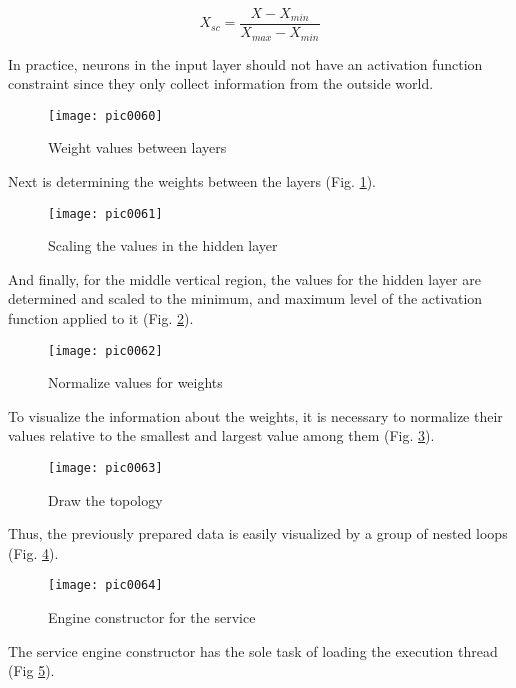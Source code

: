 \begin{equation}
\label{equation04}
X_{sc} = \frac{X-X_{min}}{X_{max}-X_{min}}
\end{equation}

In practice, neurons in the input layer should not have an activation function constraint since they only collect information from the outside world.

\begin{figure}[h]
\centering
\texttt{[image: pic0060]}
\caption{Weight values between layers}
\label{fig:pic0060}
\end{figure}
\FloatBarrier

Next is determining the weights between the layers (Fig. \ref{fig:pic0060}).

\begin{figure}[h]
\centering
\texttt{[image: pic0061]}
\caption{Scaling the values in the hidden layer}
\label{fig:pic0061}
\end{figure}
\FloatBarrier

And finally, for the middle vertical region, the values for the hidden layer are determined and scaled to the minimum, and maximum level of the activation function applied to it (Fig. \ref{fig:pic0061}).

\begin{figure}[h]
\centering
\texttt{[image: pic0062]}
\caption{Normalize values for weights}
\label{fig:pic0062}
\end{figure}
\FloatBarrier

To visualize the information about the weights, it is necessary to normalize their values relative to the smallest and largest value among them (Fig. \ref{fig:pic0062}).

\begin{figure}[h]
\centering
\texttt{[image: pic0063]}
\caption{Draw the topology}
\label{fig:pic0063}
\end{figure}
\FloatBarrier

Thus, the previously prepared data is easily visualized by a group of nested loops (Fig. \ref{fig:pic0063}).

\begin{figure}[h]
\centering
\texttt{[image: pic0064]}
\caption{Engine constructor for the service}
\label{fig:pic0064}
\end{figure}
\FloatBarrier

The service engine constructor has the sole task of loading the execution thread (Fig \ref{fig:pic0064}).

